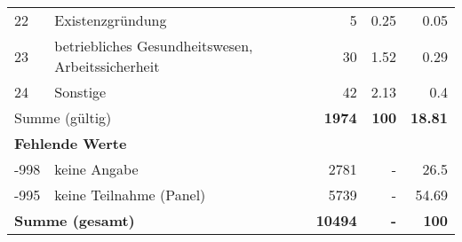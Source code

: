 \begin{longtable}{lXrrr}
        22 & \multicolumn{1}{X}{Existenzgründung} & %
          \num{5} &
          \num[round-mode=places,round-precision=2]{0.25} &
          \num[round-mode=places,round-precision=2]{0.05} \\

        23 & \multicolumn{1}{X}{betriebliches Gesundheitswesen, Arbeitssicherheit} & %
          \num{30} &
          \num[round-mode=places,round-precision=2]{1.52} &
          \num[round-mode=places,round-precision=2]{0.29} \\

        24 & \multicolumn{1}{X}{Sonstige} & %
          \num{42} &
          \num[round-mode=places,round-precision=2]{2.13} &
          \num[round-mode=places,round-precision=2]{0.4} \\

     \midrule
     \multicolumn{2}{l}{Summe (gültig)} &
       \textbf{\num{1974}} &
     \textbf{\num{100}} &
       \textbf{\num[round-mode=places,round-precision=2]{18.81}} \\
     \multicolumn{5}{l}{\textbf{Fehlende Werte}}\\
       -998 &
       keine Angabe &
         \num{2781} &
        - &
         \num[round-mode=places,round-precision=2]{26.5} \\
       -995 &
       keine Teilnahme (Panel) &
         \num{5739} &
        - &
         \num[round-mode=places,round-precision=2]{54.69} \\
     \midrule
     \multicolumn{2}{l}{\textbf{Summe (gesamt)}} &
          \textbf{\num{10494}} &
        \textbf{-} &
        \textbf{\num{100}} \\
     \bottomrule
     \end{longtable}
     
